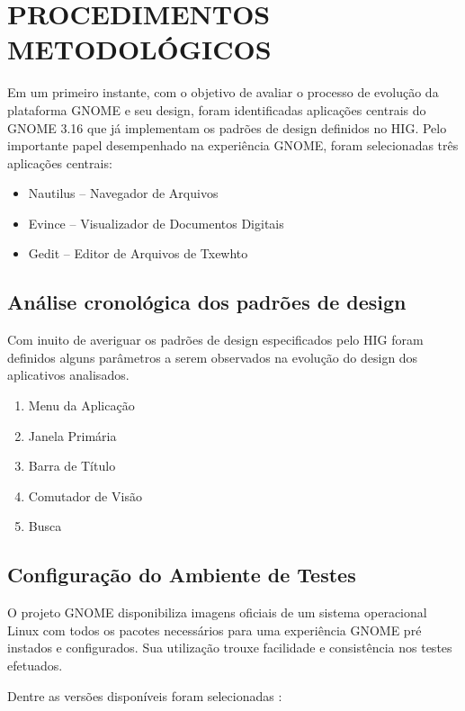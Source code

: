 \chapter{PROCEDIMENTOS METODOLÓGICOS}

Em um primeiro instante, com o objetivo de avaliar o processo de evolução da
plataforma GNOME e seu design, foram identificadas aplicações centrais do
GNOME 3.16 que já implementam os padrões de design definidos no HIG. Pelo
importante papel desempenhado na experiência GNOME, foram selecionadas três
aplicações centrais:

\begin{itemize}
    \item Nautilus -- Navegador de Arquivos
    \item Evince -- Visualizador de Documentos Digitais
    \item Gedit -- Editor de Arquivos de Txewhto
\end{itemize}

\section{Análise cronológica dos padrões de design}

Com inuito de averiguar os padrões de design especificados pelo HIG
\cite{hig314patterns} foram definidos alguns parâmetros a serem observados na
evolução do design dos aplicativos analisados.

\begin{enumerate}
  \item Menu da Aplicação
  \item Janela Primária
  \item Barra de Título
  \item Comutador de Visão
  \item Busca
\end{enumerate}

\section{Configuração do Ambiente de Testes}

O projeto GNOME disponibiliza imagens oficiais de um sistema operacional Linux
com todos os pacotes necessários para uma experiência GNOME pré instados e
configurados. Sua utilização trouxe facilidade e consistência nos testes
efetuados.

Dentre as versões disponíveis foram selecionadas :

